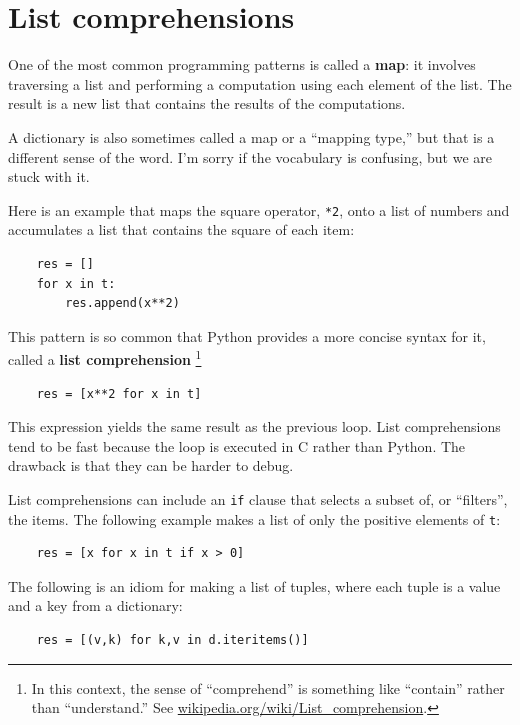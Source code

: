 \documentclass[10pt]{book}
\begin{document}
\section{List comprehensions}

One of the most common programming patterns is called a
{\bf map}: it involves traversing a list and performing
a computation using each element
of the list.  The result is a new list that contains the
results of the computations.

A dictionary is also sometimes called a map or a 
``mapping type,'' but that is a different sense of the word.
I'm sorry if the vocabulary is confusing, but we are stuck
with it.

Here is an example that maps the square operator, {\tt **2}, onto a
list of numbers and accumulates a list that contains the square of
each item:

\begin{verbatim}
    res = []
    for x in t:
        res.append(x**2)
\end{verbatim}

This pattern is so common that Python provides a more
concise syntax for it, called a {\bf list comprehension}
\footnote{In this context, the sense of ``comprehend'' is something
  like ``contain'' rather than ``understand.''  See
  \url{wikipedia.org/wiki/List_comprehension}. }

\begin{verbatim}
    res = [x**2 for x in t]
\end{verbatim}

This expression yields the same result as the previous loop.  List
comprehensions tend to be fast because the loop is executed in C
rather than Python.  The drawback is that they can be harder to debug.

List comprehensions can include an {\tt if} clause that selects a
subset of, or ``filters'', the items.  The following example makes a
list of only the positive elements of {\tt t}:

\begin{verbatim}
    res = [x for x in t if x > 0]
\end{verbatim}

The following is an idiom for making a list of tuples, where
each tuple is a value and a key from a dictionary:

\begin{verbatim}
    res = [(v,k) for k,v in d.iteritems()]
\end{verbatim}
\end{document}
